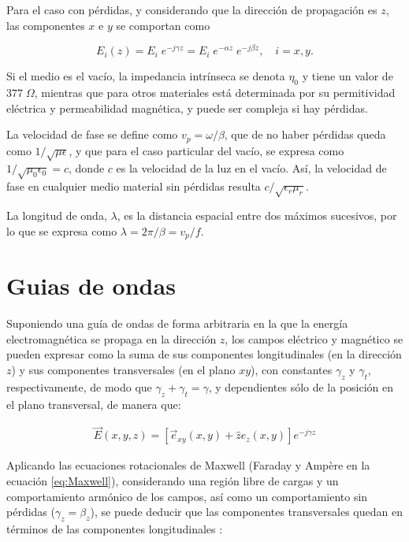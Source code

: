 Para el caso con pérdidas, y considerando que la dirección de propagación es $z$, las componentes $x$ e $y$ se comportan como

\begin{equation}
E_i(z) = E_i \; e^{-j\gamma z} = E_i \; e^{-\alpha z} \; e^{-j \beta z}, \quad i=x,y. \nonumber
\end{equation}

Si el medio es el vacío, la impedancia intrínseca se denota $\eta_0$ y tiene un valor de $377\; \Omega$, mientras que para otros materiales está determinada por su permitividad eléctrica y permeabilidad magnética, y puede ser compleja si hay pérdidas.

La velocidad de fase se define como $v_p=\omega/\beta$, que de no haber pérdidas queda como $1/\sqrt{\mu \epsilon}$, y que para el caso particular del vacío, se expresa como $1/\sqrt{\mu_0 \epsilon_0} = c$, donde $c$ es la velocidad de la luz en el vacío. Así, la velocidad de fase en cualquier medio material sin pérdidas resulta $c/\sqrt{\epsilon_r \mu_r}$.

La longitud de onda, $\lambda$, es la distancia espacial entre dos máximos sucesivos, por lo que se expresa como $\lambda = 2\pi / \beta = v_p/f$.

\section{Guias de ondas}
\label{subsec_guias_de_ondas}

Suponiendo una guía de ondas de forma arbitraria en la que la energía electromagnética se propaga en la dirección $z$, los campos eléctrico y magnético se pueden expresar como la suma de sus componentes longitudinales (en la dirección $z$) y sus componentes transversales (en el plano $xy$), con constantes $\gamma_z$ y $\gamma_t$, respectivamente, de modo que $\gamma_z + \gamma_t = \gamma$, y dependientes sólo de la posición en el plano transversal, de manera que:

\begin{align}
	\vec{E}(x,y,z) = \left[ \vec{e}_{xy}(x,y) + \hat{z} e_z(x,y) \right] e^{-j\gamma z}
\end{align}

Aplicando las ecuaciones rotacionales de Maxwell (Faraday y Ampère en la ecuación \ref{eq:Maxwell}), considerando una región libre de cargas y un comportamiento armónico de los campos, así como un comportamiento sin pérdidas ($\gamma_z = \beta_z$), se puede deducir que las componentes transversales quedan en términos de las componentes longitudinales \cite{Fernandez:Electromag}:

